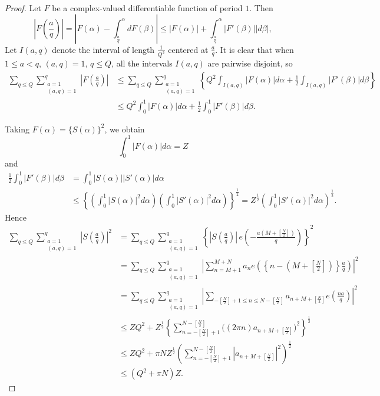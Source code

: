 \begin{proof}
Let $F$ be a complex-valued differentiable function of period $1$. Then
\[
\left|F\left(\frac{a}{q}\right)\right|
=\left|F(\alpha)-\int_{\frac{a}{q}}^{\alpha}dF(\beta)\right|
\leqslant|F(\alpha)|+\int_{\frac{a}{q}}^{\alpha}|F'(\beta)||d\beta|,
\]
Let $I(a,q)$ denote the interval of length $\frac{1}{Q^2}$ centered at $\frac{a}{q}$. It is clear that when $1\leqslant a<q$, $(a,q)=1$, $q\leqslant Q$, all the intervals $I(a,q)$ are pairwise disjoint, so
\begin{align*}
\sum_{q\leqslant Q}\sum_{\substack{a=1\\(a,q)=1}}^{q}
\left|F\left(\frac{a}{q}\right)\right|
&\leqslant\sum_{q\leqslant Q}\sum_{\substack{a=1\\(a,q)=1}}^{q}
\left\{Q^2\int_{I(a,q)}|F(\alpha)|d\alpha
+\frac{1}{2}\int_{I(a,q)}|F'(\beta)|d\beta\right\}\\
&\leqslant Q^2\int_{0}^{1}|F(\alpha)|d\alpha
+\frac{1}{2}\int_{0}^{1}|F'(\beta)|d\beta.
\end{align*}

Taking $F(\alpha)=\{S(\alpha)\}^2$, we obtain
\[
\int_{0}^{1}|F(\alpha)|d\alpha=Z
\]
and
\begin{align*}
\frac{1}{2}\int_{0}^{1}|F'(\beta)|d\beta
&=\int_{0}^{1}|S(\alpha)||S'(\alpha)|d\alpha\\
&\leqslant\left\{\left(\int_{0}^{1}|S(\alpha)|^2d\alpha\right)
\left(\int_{0}^{1}|S'(\alpha)|^2d\alpha\right)\right\}^{\frac12}
=Z^{\frac12}\left(\int_{0}^{1}|S'(\alpha)|^2d\alpha\right)^{\frac12}.
\end{align*}
Hence
\begin{align*}
\sum_{q\leqslant Q}\sum_{\substack{a=1\\(a,q)=1}}^{q}
\left|S\left(\frac{a}{q}\right)\right|^2
&=\sum_{q\leqslant Q}\sum_{\substack{a=1\\(a,q)=1}}^{q}
\left\{\left|S\left(\frac{a}{q}\right)\right|
\,e\left(-\frac{a\left(M+\left[\frac{N}{2}\right]\right)}{q}\right)\right\}^2\\
&=\sum_{q\leqslant Q}\sum_{\substack{a=1\\(a,q)=1}}^{q}
\left|\sum_{n=M+1}^{M+N}a_n e\left(\left\{n-\left(M+\left[\frac{N}{2}\right]\right)\right\}\frac{a}{q}\right)\right|^2\\
&=\sum_{q\leqslant Q}\sum_{\substack{a=1\\(a,q)=1}}^{q}
\left|\sum_{-\left[\frac{N}{2}\right]+1\leqslant n\leqslant N-\left[\frac{N}{2}\right]}
a_{n+M+\left[\frac{N}{2}\right]}e\left(\frac{na}{q}\right)\right|^2\\
&\leqslant ZQ^2+Z^{\frac12}
\left\{\sum_{n=-\left[\frac{N}{2}\right]+1}^{N-\left[\frac{N}{2}\right]}
\bigl((2\pi n)a_{n+M+\left[\frac{N}{2}\right]}\bigr)^2\right\}^{\frac12}\\
&\leqslant ZQ^2+\pi NZ^{\frac12}
\left(\sum_{n=-\left[\frac{N}{2}\right]+1}^{N-\left[\frac{N}{2}\right]}
\left|a_{n+M+\left[\frac{N}{2}\right]}\right|^2\right)^{\frac12}\\
&\leqslant(Q^2+\pi N)Z.\tag{4}
\end{align*}


\end{proof}
